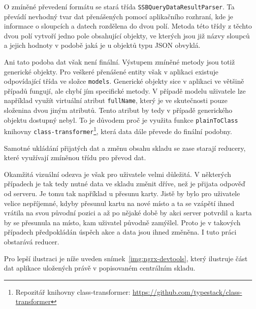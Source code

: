 O zmíněné převedení formátu se stará třída \texttt{SSBQueryDataResultParser}. Ta převádí nevhodný tvar dat přenášených pomocí aplikačního rozhraní, kde je informace o sloupcích a datech rozdělena do dvou polí. Metoda této třídy z těchto dvou polí vytvoří jedno pole obsahující objekty, ve kterých jsou již názvy sloupců a jejich hodnoty v podobě jaká je u objektů typu JSON obvyklá.

Ani tato podoba dat však není finální. Výstupem zmíněné metody jsou totiž generické objekty. Pro veškeré přenášené entity však v aplikaci existuje odpovídající třída ve složce \texttt{models}. Generické objekty sice v aplikaci ve většině případů fungují, ale chybí jím specifické metody. V případě modelu uživatele lze například využít virtuální atribut \texttt{fullName}, který je ve skutečnosti pouze složenina dvou jiným atributů. Tento atribut by tedy v případě generického objektu dostupný nebyl. 
To je důvodem proč je využita funkce \texttt{plainToClass} knihovny \texttt{class-transformer}\footnote{Repozitář knihovny class-transformer: \url{https://github.com/typestack/class-transformer}}, která data dále převede do finální podobny.

Samotné ukládání přijatých dat a změnu obsahu skladu se zase starají reducery, které využívají zmíněnou třídu pro převod dat. 

Okamžitá vizuální odezva je však pro uživatele velmi důležitá. V některých případech je tak tedy nutné data ve skladu změnit dříve, než je přijata odpověď od serveru. Je tomu tak například u přesunu karty. Jistě by bylo pro uživatele velice nepříjemné, kdyby přesunul kartu na nové místo a ta se vzápětí ihned vrátila na svou původní pozici a až po nějaké době by akci server potvrdil a karta by se přesunula na místo, kam uživatel původně zamýšlel. Proto je v takových případech předpokládán úspěch akce a data jsou ihned změněna. I tuto práci obstarává reducer.

Pro lepší ilustraci je níže uveden snímek~\ref{img:ngrx-devtools}, který ilustruje část dat aplikace uložených právě v popisovaném centrálním skladu.

